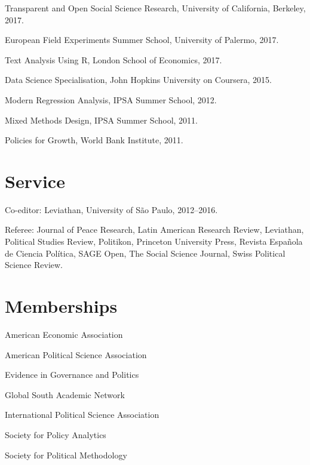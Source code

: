 \documentclass[a4paper]{article}
\renewenvironment{itemize}{
	\begin{list}{}{
			\setlength{\leftmargin}{1.5em}
		}
		}{
	\end{list}
}
\begin{document}
\begin{itemize}
\item Transparent and Open Social Science Research, University of California, Berkeley, 2017. %
\item European Field Experiments Summer School, University of Palermo, 2017.
\item Text Analysis Using R, London School of Economics, 2017.
\item Data Science Specialisation, John Hopkins University on Coursera, 2015.
\item Modern Regression Analysis, IPSA Summer School, 2012.
\item Mixed Methods Design, IPSA Summer School, 2011.
\item Policies for Growth, World Bank Institute, 2011.
\end{itemize}

\section*{Service}

\begin{itemize}
\item Co-editor: Leviathan, University of São Paulo, 2012--2016.
\item Referee: Journal of Peace Research, Latin American Research Review, Leviathan, Political Studies Review, Politikon, Princeton University Press, Revista Española de Ciencia Política, SAGE Open, The Social Science Journal, Swiss Political Science Review.
\end{itemize} 

\section*{Memberships}

\begin{itemize}
\item American Economic Association
\item American Political Science Association
\item Evidence in Governance and Politics
\item Global South Academic Network
\item International Political Science Association
\item Society for Policy Analytics
\item Society for Political Methodology
\end{itemize}
\end{document}
